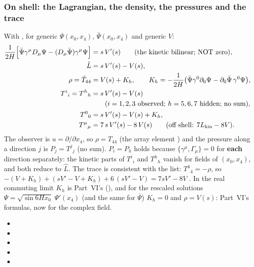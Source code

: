 \subsubsection{On shell: the Lagrangian, the density, the pressures and the trace}
\label{sec:3.6.4}

With , for generic $\Psi(x_0,x_4)$, $\bar\Psi(x_0,x_4)$ and generic $V$:
\begin{align*}
  \frac{1}{2H}\Bigl[\bar\Psi\gamma^\mu D_\mu\Psi-(D_\mu\bar\Psi)\gamma^\mu\Psi\Bigr]&=s\,V'(s)
    \qquad\text{(the kinetic bilinear; NOT zero)},\\
  \hat L&=s\,V'(s)-V(s),\\
  \rho=\hat T_{44}&=V(s)+K_h,\qquad K_h=-\frac{1}{2H}\bigl(\bar\Psi\gamma^0\partial_0\Psi-\partial_0\bar\Psi\,\gamma^0\Psi\bigr),\\
  T^i{}_i=T^h{}_h&=s\,V'(s)-V(s)\\
    &\qquad(i=1,2,3\text{ observed; } h=5,6,7\text{ hidden; no sum}),\\
  T^0{}_0&=s\,V'(s)-V(s)+K_h,\\
  T^\mu{}_\mu&=7\,s\,V'(s)-8\,V(s)\qquad(\text{off shell: } 7L_{\mathrm{kin}}-8V).
\end{align*}
The observer is $u=\partial/\partial x_4$, so $\rho=T_{44}$ (the array element \cfcode{[[5,5]]}) and
the pressure along a direction $j$ is $P_j=T^j{}_j$ (no sum). $P_i=P_h$ holds because
$\{\gamma^\mu,\Gamma_\mu\}=0$ for \textbf{each} direction separately: the kinetic parts of $T^i{}_i$
and $T^h{}_h$ vanish for fields of $(x_0,x_4)$, and both reduce to $\hat L$. The trace is consistent
with the list: $T^4{}_4=-\rho$, so $-(V+K_h)+(sV'-V+K_h)+6\,(sV'-V)=7sV'-8V$ \cfderived. In the real
commuting limit $K_h$ is Part~VI's  (), and for the rescaled solutions
$\Psi=\sqrt{\sin 6Hx_0}\;\Psi'(x_4)$ (and the same for $\bar\Psi$) $K_h=0$ and $\rho=V(s)$: Part~VI's
formulas, now for the complex field. 
\begin{itemize}
  \item {}
  \item {}
  \item {}
  \item {}
  \item {}
\end{itemize}

